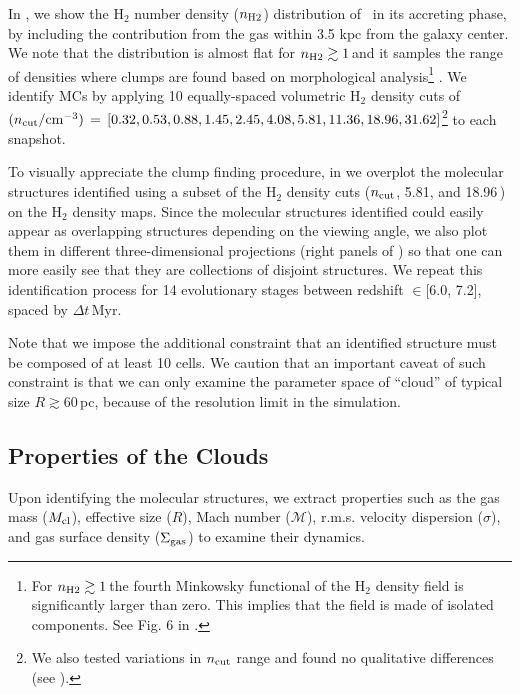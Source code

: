 \IfFileExists{emulateapjlegacy.cls}{\documentclass[iop]{emulateapjlegacy}}{\documentclass[iop]{emulateapj}}
\begin{document}
In , we show the H$_2$ number density ($n_{\rm H2}$) distribution of \flower~in its accreting phase, by including the contribution from the gas within 3.5 kpc from the galaxy center.
%
We note that the distribution is almost flat for $n_{\rm H2}\gtrsim1$\,\cc and it samples the range of densities where clumps are found based on morphological analysis\footnote{For $n_{\rm H2}\gtrsim1$\,\cc the fourth Minkowsky functional of the H$_{2}$ density field is significantly larger than zero. This implies that the field is made of isolated components. See Fig. 6 in \citet{Pallottini17b}.} \citep{Pallottini17b}. We identify MCs by applying 10 equally-spaced volumetric H$_2$ density cuts of ${(n_{\rm cut}/{\rm cm^{-3})}}\,=\,[0.32, 0.53, 0.88, 1.45, 2.45, 4.08, 5.81, 11.36, 18.96, 31.62]$\footnote{We also tested variations in $n_{\rm cut}$ range and found no qualitative differences (see ).} to each snapshot.

To visually appreciate  the clump finding procedure, in  we overplot the molecular structures identified using a subset of the H$_2$ density cuts ($n_{\rm cut}$, 5.81, and 18.96\,\cc) on the H$_2$ density maps.
Since the molecular structures identified could easily appear as overlapping structures depending on the viewing angle, we also plot them in different three-dimensional projections (right panels of ) so that one can more easily see that they are collections of disjoint structures.
%
We repeat this identification process for 14 evolutionary stages between redshift \z$\in$[6.0, 7.2], spaced by $\Delta t$\,Myr.

Note that we impose the additional constraint that an identified structure must be composed of at least 10 cells. We caution that an important caveat of such constraint is that we can only examine the parameter space of ``cloud'' of typical size $R\gtrsim 60$\,pc, because of the resolution limit in the simulation.

\subsection{Properties of the Clouds}

Upon identifying the molecular structures, we extract properties such as the gas mass ($M_{\rm cl}$), effective size ($R$), Mach number ($\mathcal{M}$), r.m.s. velocity dispersion ($\sigma$), and gas surface density ($\Sigma_{\rm gas}$) to examine their dynamics.
\end{document}
